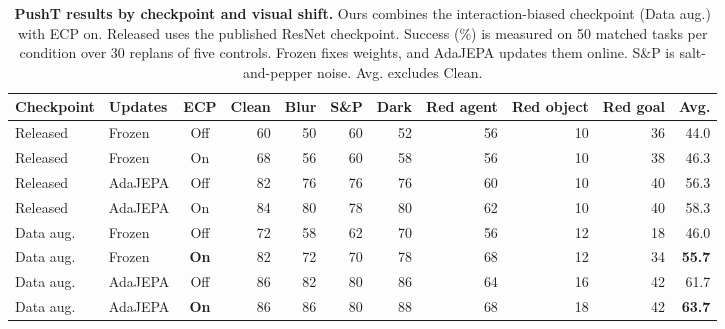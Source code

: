 \begin{table}[t]
\centering
\caption{\textbf{PushT results by checkpoint and visual shift.} Ours combines the interaction-biased checkpoint (Data aug.) with ECP on. Released uses the published ResNet checkpoint. Success (\%) is measured on 50 matched tasks per condition over 30 replans of five controls. Frozen fixes weights, and AdaJEPA updates them online. S\&P is salt-and-pepper noise. Avg. excludes Clean.}
\label{tab:pusht-ecp}
\small
\setlength{\tabcolsep}{3.7pt}
\begin{tabular*}{\textwidth}{@{\extracolsep{\fill}}llcrrrrrrrr@{}}
\toprule
Checkpoint & Updates & ECP & Clean & Blur & S\&P & Dark & Red agent & Red object & Red goal & Avg.\\
\midrule
Released & Frozen & Off & 60 & 50 & 60 & 52 & 56 & 10 & 36 & 44.0\\
Released & Frozen & On & 68 & 56 & 60 & 58 & 56 & 10 & 38 & 46.3\\
Released & AdaJEPA & Off & 82 & 76 & 76 & 76 & 60 & 10 & 40 & 56.3\\
Released & AdaJEPA & On & 84 & 80 & 78 & 80 & 62 & 10 & 40 & 58.3\\
\midrule
Data aug. & Frozen & Off & 72 & 58 & 62 & 70 & 56 & 12 & 18 & 46.0\\
Data aug. & Frozen & \textbf{On} & 82 & 72 & 70 & 78 & 68 & 12 & 34 & \textbf{55.7}\\
Data aug. & AdaJEPA & Off & 86 & 82 & 80 & 86 & 64 & 16 & 42 & 61.7\\
Data aug. & AdaJEPA & \textbf{On} & 86 & 86 & 80 & 88 & 68 & 18 & 42 & \textbf{63.7}\\
\bottomrule
\end{tabular*}
\end{table}
